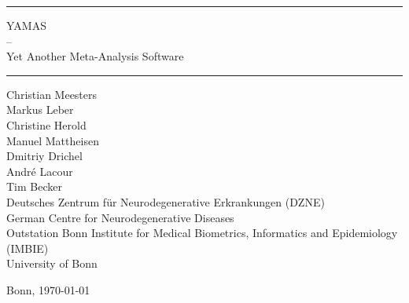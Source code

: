 
\thispagestyle{empty}
\newcommand{\Rule}{\rule{\textwidth}{1mm}}
\begin{center}
\Rule\vspace{5mm}
\sffamily\bfseries\LARGE

YAMAS \\
-- \\
Yet Another Meta-Analysis Software
\vspace{1mm}\Rule
\vfill
Christian Meesters\\
Markus Leber\\
Christine Herold\\
Manuel Mattheisen\\
Dmitriy Drichel\\
André Lacour\\
Tim Becker\\
\vfill
Deutsches Zentrum für Neurodegenerative Erkrankungen (DZNE)\\
German Centre for Neurodegenerative Diseases\\
Outstation Bonn
\vfill
Institute for Medical Biometrics, Informatics and Epidemiology (IMBIE)\\
University of Bonn

\vspace{2cm}

\hfill
\vfill
\small Bonn, \today
\end{center}
